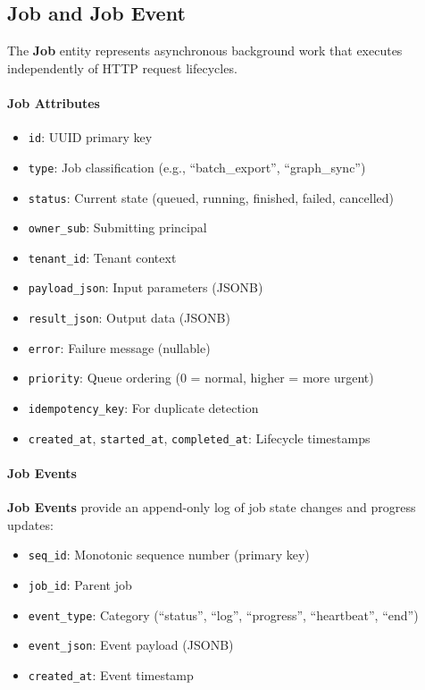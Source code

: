 \subsection{Job and Job Event}

The \textbf{Job} entity represents asynchronous background work that executes independently of HTTP request lifecycles.

\paragraph{Job Attributes}
\begin{itemize}
    \item \texttt{id}: UUID primary key
    \item \texttt{type}: Job classification (e.g., ``batch\_export'', ``graph\_sync'')
    \item \texttt{status}: Current state (queued, running, finished, failed, cancelled)
    \item \texttt{owner\_sub}: Submitting principal
    \item \texttt{tenant\_id}: Tenant context
    \item \texttt{payload\_json}: Input parameters (JSONB)
    \item \texttt{result\_json}: Output data (JSONB)
    \item \texttt{error}: Failure message (nullable)
    \item \texttt{priority}: Queue ordering (0 = normal, higher = more urgent)
    \item \texttt{idempotency\_key}: For duplicate detection
    \item \texttt{created\_at}, \texttt{started\_at}, \texttt{completed\_at}: Lifecycle timestamps
\end{itemize}

\paragraph{Job Events}
\textbf{Job Events} provide an append-only log of job state changes and progress updates:
\begin{itemize}
    \item \texttt{seq\_id}: Monotonic sequence number (primary key)
    \item \texttt{job\_id}: Parent job
    \item \texttt{event\_type}: Category (``status'', ``log'', ``progress'', ``heartbeat'', ``end'')
    \item \texttt{event\_json}: Event payload (JSONB)
    \item \texttt{created\_at}: Event timestamp
\end{itemize}

